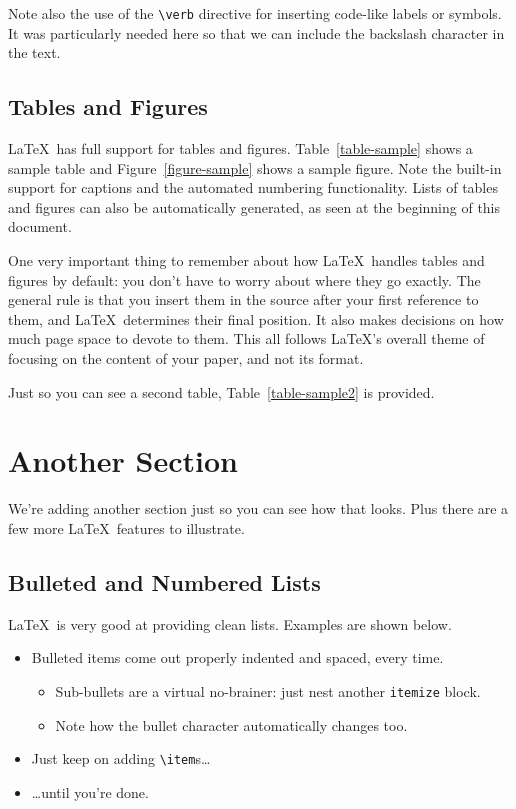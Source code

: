 \documentclass{article}
\begin{document}
Note also the use of the \verb!\verb! directive for inserting code-like labels or symbols.  It was particularly needed here so that we can include the backslash character in the text.

\subsection{Tables and Figures}

\LaTeX\ has full support for tables and figures.  Table~\ref{table-sample} shows a sample table and Figure~\ref{figure-sample} shows a sample figure.  Note the built-in support for captions and the automated numbering functionality.  Lists of tables and figures can also be automatically generated, as seen at the beginning of this document.




One very important thing to remember about how \LaTeX\ handles tables and figures by default: you don't have to worry about where they go exactly.  The general rule is that you insert them in the source after your first reference to them, and \LaTeX\ determines their final position.  It also makes decisions on how much page space to devote to them.  This all follows \LaTeX's overall theme of focusing on the content of your paper, and not its format.

Just so you can see a second table, Table~\ref{table-sample2} is provided.


\section{Another Section}

We're adding another section just so you can see how that looks.  Plus there are a few more \LaTeX\ features to illustrate.

\subsection{Bulleted and Numbered Lists}

\LaTeX\ is very good at providing clean lists.  Examples are shown below.

\begin{itemize}
\item Bulleted items come out properly indented and spaced, every time.

\begin{itemize}
\item Sub-bullets are a virtual no-brainer: just nest another \verb!itemize! block.
\item Note how the bullet character automatically changes too.
\end{itemize}

\item Just keep on adding \verb!\item!s\ldots

\item \ldots until you're done.
\end{itemize}
\end{document}
